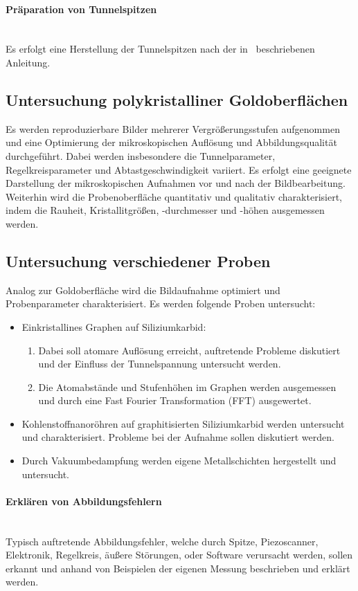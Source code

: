 \documentclass[a4paper,twoside,final]{article}
\begin{document}
\paragraph*{Präparation von Tunnelspitzen}$~$\\
Es erfolgt eine Herstellung der Tunnelspitzen nach der in~\cite{Nanosurf} beschriebenen Anleitung.
\subsection{Untersuchung polykristalliner Goldoberflächen}
Es werden reproduzierbare Bilder mehrerer Vergrößerungsstufen aufgenommen und eine Optimierung der mikroskopischen Auflösung und Abbildungsqualität durchgeführt. Dabei werden insbesondere die Tunnelparameter, Regelkreisparameter und Abtastgeschwindigkeit variiert. Es erfolgt eine geeignete Darstellung der mikroskopischen Aufnahmen vor und nach der Bildbearbeitung.\\
Weiterhin wird die Probenoberfläche quantitativ und qualitativ charakterisiert, indem die Rauheit, Kristallitgrößen, -durchmesser und -höhen ausgemessen werden.
\subsection{Untersuchung verschiedener Proben}
Analog zur Goldoberfläche wird die Bildaufnahme optimiert und Probenparameter charakterisiert. Es werden folgende Proben untersucht:
\begin{itemize}
  \item Einkristallines Graphen auf Siliziumkarbid:
  \begin{enumerate}
    \item Dabei soll atomare Auflösung erreicht, auftretende Probleme diskutiert und der Einfluss der Tunnelspannung untersucht werden.
    \item Die Atomabstände und Stufenhöhen im Graphen werden ausgemessen und durch eine Fast Fourier Transformation (FFT) ausgewertet.
  \end{enumerate}
  \item Kohlenstoffnanoröhren auf graphitisierten Siliziumkarbid werden untersucht und charakterisiert. Probleme bei der Aufnahme sollen diskutiert werden.
  \item Durch Vakuumbedampfung werden eigene Metallschichten hergestellt und untersucht.
\end{itemize}

\paragraph{Erklären von Abbildungsfehlern}$~$\\
Typisch auftretende Abbildungsfehler, welche durch Spitze, Piezoscanner, Elektronik, Regelkreis, äußere Störungen, oder Software verursacht werden, sollen erkannt und anhand von Beispielen der eigenen Messung beschrieben und erklärt werden.
\end{document}

